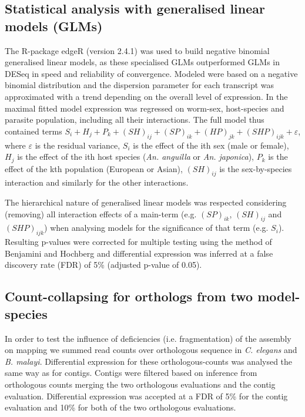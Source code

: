 \documentclass[10pt]{article}
\begin{document}
\subsection{Statistical analysis with generalised linear models (GLMs)}

The R-package edgeR (version 2.4.1) \cite{pmid19910308} was used to
build negative binomial generalised linear models, as these
specialised GLMs outperformed GLMs in DESeq in speed and reliability
of convergence. Modeled were based on a negative binomial distribution
and the dispersion parameter for each transcript was approximated with
a trend depending on the overall level of expression. In the maximal
fitted model expression was regressed on worm-sex, host-species and
parasite population, including all their interactions. The full model
thus contained terms $ S_i + H_j + P_k + (SH)_{ij} + (SP)_{ik} +
(HP)_{jk} + (SHP)_{ijk} + \varepsilon$, where $\varepsilon$ is the
residual variance, $S_i$ is the effect of the ith sex (male or
female), $H_j$ is the effect of the ith host species
(\textit{An. anguilla} or \textit{An. japonica}), $P_k$ is the effect
of the kth population (European or Asian), $(SH)_{ij}$ is the
sex-by-species interaction and similarly for the other interactions.

The hierarchical nature of generalised linear models was respected
considering (removing) all interaction effects of a main-term
(e.g. $(SP)_{ik}$, $(SH)_{ij}$ and $(SHP)_{ijk}$) when analysing
models for the significance of that term (e.g. $S_i$). Resulting
p-values were corrected for multiple testing using the method of
Benjamini and Hochberg \cite{benjamini1995controlling} and
differential expression was inferred at a false discovery rate (FDR)
of 5\% (adjusted p-value of 0.05).

\subsection{Count-collapsing for orthologs from two model-species}
\label{collapse}

In order to test the influence of deficiencies (i.e. fragmentation) of
the assembly on mapping we summed read counts over orthologous
sequence in \textit{C. elegans} and \textit{B. malayi}.  Differential
expression for these orthologous-counts was analysed the same way as
for contigs. Contigs were filtered based on inference from orthologous
counts merging the two orthologous evaluations and the contig
evaluation. Differential expression was accepted at a FDR of 5\% for
the contig evaluation and 10\% for both of the two orthologous
evaluations.
\end{document}
